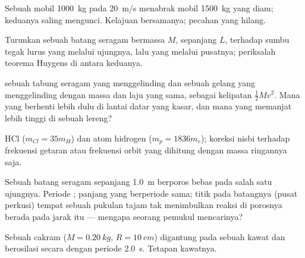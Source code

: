 \begin{exercise}[$\star$]\label{exo:b1:systems-of-points:3}
Sebuah mobil \qty{1000}{kg} pada \qty{20}{m/s} menabrak mobil \qty{1500}{kg} yang diam;
keduanya saling mengunci. Kelajuan bersamanya; pecahan  yang hilang.
\end{exercise}

\begin{exercise}[$\star$]\label{exo:b1:systems-of-points:4}
Turunkan  sebuah batang seragam bermassa $M$, sepanjang $L$,
terhadap sumbu tegak lurus yang melalui ujungnya, lalu yang melalui pusatnya;
periksalah teorema Huygens di antara keduanya.
\end{exercise}

\begin{exercise}[$\star\star$]\label{exo:b1:systems-of-points:5}
 sebuah tabung seragam yang menggelinding dan sebuah gelang yang menggelinding
dengan massa dan laju yang sama, sebagai kelipatan $\tfrac12 Mv^2$. Mana yang berhenti
lebih dulu di lantai datar yang kasar, dan mana yang memanjat lebih tinggi di sebuah lereng?
\end{exercise}

\begin{exercise}[$\star\star$]\label{exo:b1:systems-of-points:6}
 HCl ($m_{Cl} = 35m_H$) dan atom hidrogen
($m_p = 1836m_e$); koreksi nisbi terhadap frekuensi getaran atau
frekuensi orbit yang dihitung dengan massa ringannya saja.
\end{exercise}

\begin{exercise}[$\star\star$]\label{exo:b1:systems-of-points:7}
Sebuah batang seragam sepanjang \qty{1.0}{m} berporos bebas pada salah satu ujungnya. Periode
; panjang  yang berperiode sama;
titik pada batangnya (pusat perkusi) tempat sebuah pukulan tajam
tak menimbulkan reaksi di porosnya berada pada jarak itu --- mengapa
seorang pemukul mencarinya?
\end{exercise}

\begin{exercise}[$\star\star$]\label{exo:b1:systems-of-points:8}
Sebuah cakram ($M = \qty{0.20}{kg}$, $R = \qty{10}{cm}$) digantung pada sebuah kawat dan
berosilasi secara  dengan periode \qty{2.0}{s}. Tetapan 
kawatnya.
\end{exercise}

